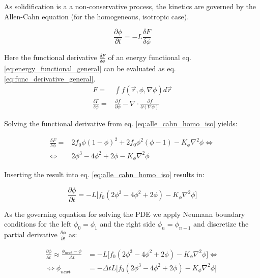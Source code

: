 As solidification is a a non-conservative process, the kinetics are governed by the Allen-Cahn equation (for the  homogeneous, isotropic case).

\begin{equation}
	\frac{\partial \phi}{\partial t} =-L \frac{\delta F}{\delta \phi} \label{eq:alle_cahn_homo_iso}
\end{equation}

Here the functional derivative \(\frac{\delta F}{\delta \phi}\) of an energy functional eq. \ref{eq:energy_functional_general} can be evaluated as eq. \ref{eq:func_derivative_general}.\\


\begin{subequations}
	\begin{align}
		F =& \int f(\vec{r}, \phi, \nabla \phi) d\vec{r} \label{eq:energy_functional_general} \\
		\frac{\delta F}{\delta \phi} =& \frac{\partial f}{ \partial \phi} - \nabla \cdot \frac{\partial f}{\partial (\nabla \phi)} \label{eq:func_derivative_general}
		\end{align}
\end{subequations}

Solving the functional derivative from eq. \ref{eq:alle_cahn_homo_iso} yields:

\begin{subequations}
	\begin{align}
		\frac{\delta F}{\delta \phi} =& 2 f_{0}\phi (1-\phi)^2 + 2 f_{0}\phi^{2} (\phi -1) - K_{\phi} \nabla^{2} \phi \Leftrightarrow \\
		\Leftrightarrow  & 2\phi^{3}  -4\phi^{2} + 2\phi - K_{\phi} \nabla^{2} \phi
	\end{align}
\end{subequations}

Inserting the result into eq. \ref{eq:alle_cahn_homo_iso} results in:

\begin{equation}
	\frac{\partial \phi}{\partial t} = -L \bigl[  f_0 ( 2\phi^{3} -4\phi^{2} + 2\phi) - K_{\phi} \nabla^{2} \phi \bigr]
\end{equation}

As the governing equation for solving the PDE we apply Neumann boundary conditions for the left \(\phi_{0} = \phi_{1}\) and the right side \(\phi_{n}= \phi_{n-1}\) and discretize the partial derivative \(\frac{\partial \phi}{\partial t}\) as:

\begin{subequations}
	\begin{align}
	\frac{\partial \phi}{\partial t}  \approx \frac{\phi_{next} - \phi}{\Delta t} &=  -L \bigl[  f_0 ( 2\phi^{3} -4\phi^{2} + 2\phi) - K_{\phi} \nabla^{2} \phi \bigr] \Leftrightarrow \\
	\Leftrightarrow \phi_{next} & = -\Delta t L \bigl[  f_0 ( 2\phi^{3} -4\phi^{2} + 2\phi) - K_{\phi} \nabla^{2} \phi \bigr]
    \end{align}
\end{subequations}

